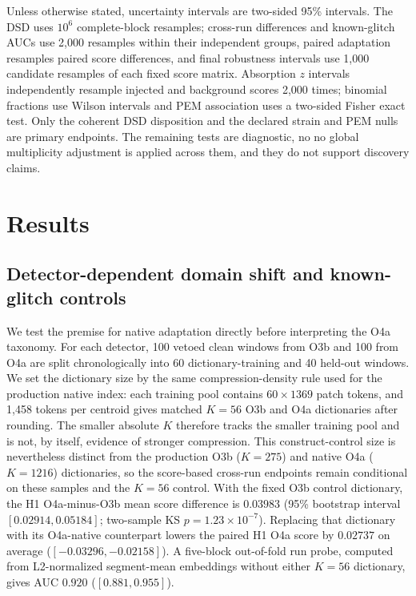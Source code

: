 \documentclass[aps,prd,twocolumn,superscriptaddress,nofootinbib,amsmath,amssymb,floatfix,10pt]{revtex4-2}
\begin{document}
Unless otherwise stated, uncertainty intervals are two-sided 95\% intervals.
The DSD uses $10^6$ complete-block resamples; cross-run differences and
known-glitch AUCs use 2,000 resamples within their independent groups, paired
adaptation resamples paired score differences, and final robustness intervals
use 1,000 candidate resamples of each fixed score matrix.  Absorption $z$
intervals independently resample injected and background scores 2,000 times;
binomial fractions use Wilson intervals and PEM association uses a two-sided
Fisher exact test.  Only the coherent DSD disposition and the declared strain
and PEM nulls are primary endpoints.  The remaining tests are diagnostic, no
no global multiplicity adjustment is applied across them, and they do not support
discovery claims.

\section{Results}
\label{sec:results}

\subsection{Detector-dependent domain shift and known-glitch controls}

We test the premise for native adaptation directly before interpreting the O4a
taxonomy.  For each detector, 100 vetoed clean windows from O3b and 100 from
O4a are split chronologically into 60 dictionary-training and 40 held-out
windows.  We set the dictionary size by the same compression-density rule used
for the production native index: each training pool contains $60\times1369$
patch tokens, and 1,458 tokens per centroid gives matched $K=56$ O3b and O4a
dictionaries after rounding.  The smaller absolute $K$ therefore tracks the
smaller training pool and is not, by itself, evidence of stronger compression.
This construct-control size is nevertheless distinct from the production O3b
($K=275$) and native O4a ($K=1216$) dictionaries, so the score-based cross-run
endpoints remain conditional on these samples and the $K=56$ control.  With the fixed O3b control dictionary, the H1
O4a-minus-O3b mean score
difference is $0.03983$ (95\% bootstrap interval $[0.02914,0.05184]$;
two-sample KS $p=1.23\times10^{-7}$).  Replacing that dictionary with its
O4a-native counterpart lowers the paired H1 O4a score by $0.02737$ on average
($[-0.03296,-0.02158]$).  A five-block out-of-fold run probe, computed from
L2-normalized segment-mean embeddings without either $K=56$ dictionary, gives
AUC $0.920$ ($[0.881,0.955]$).
\end{document}
